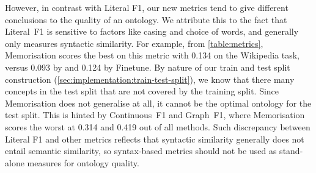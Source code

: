 However, in contrast with Literal F1, our new metrics tend to give different conclusions to the quality of an ontology. We attribute this to the fact that Literal~F1 is sensitive to factors like casing and choice of words, and generally only measures syntactic similarity. For example, from \cref{table:metrics}, Memorisation scores the best on this metric with 0.134 on the Wikipedia task, versus 0.093 by \name and 0.124 by Finetune. By nature of our train and test split construction (\cref{sec:implementation:train-test-split}), we know that there many concepts in the test split that are not covered by the training split. Since Memorisation does not generalise at all, it cannot be the optimal ontology for the test split. This is hinted by Continuous~F1 and Graph~F1, where Memorisation scores the worst at 0.314 and 0.419 out of all methods. Such discrepancy between Literal F1 and other metrics reflects that syntactic similarity generally does not entail semantic similarity, so syntax-based metrics should not be used as stand-alone measures for ontology quality.





